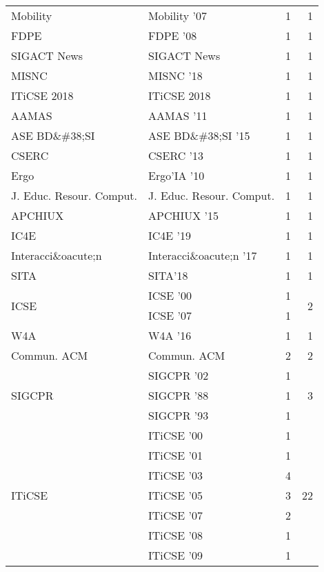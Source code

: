 \begin{table*}[t]
\begin{tabular}{llrr}
\multirow{1}{*}{Mobility } & Mobility '07 & 1 & \multirow{1}{*}{1}\\
\multirow{1}{*}{FDPE } & FDPE '08 & 1 & \multirow{1}{*}{1}\\
\multirow{1}{*}{SIGACT News} & SIGACT News & 1 & \multirow{1}{*}{1}\\
\multirow{1}{*}{MISNC } & MISNC '18 & 1 & \multirow{1}{*}{1}\\
\multirow{1}{*}{ITiCSE 2018} & ITiCSE 2018 & 1 & \multirow{1}{*}{1}\\
\multirow{1}{*}{AAMAS } & AAMAS '11 & 1 & \multirow{1}{*}{1}\\
\multirow{1}{*}{ASE BD\&\#38;SI } & ASE BD\&\#38;SI '15 & 1 & \multirow{1}{*}{1}\\
\multirow{1}{*}{CSERC } & CSERC '13 & 1 & \multirow{1}{*}{1}\\
\multirow{1}{*}{Ergo} & Ergo'IA '10 & 1 & \multirow{1}{*}{1}\\
\multirow{1}{*}{J. Educ. Resour. Comput.} & J. Educ. Resour. Comput. & 1 & \multirow{1}{*}{1}\\
\multirow{1}{*}{APCHIUX } & APCHIUX '15 & 1 & \multirow{1}{*}{1}\\
\multirow{1}{*}{IC4E } & IC4E '19 & 1 & \multirow{1}{*}{1}\\
\multirow{1}{*}{Interacci\&oacute;n } & Interacci\&oacute;n '17 & 1 & \multirow{1}{*}{1}\\
\multirow{1}{*}{SITA} & SITA'18 & 1 & \multirow{1}{*}{1}\\
\multirow{2}{*}{ICSE } & ICSE '00 & 1 & \multirow{2}{*}{2}\\
& ICSE '07 & 1 &\\
\multirow{1}{*}{W4A } & W4A '16 & 1 & \multirow{1}{*}{1}\\
\multirow{1}{*}{Commun. ACM} & Commun. ACM & 2 & \multirow{1}{*}{2}\\
\multirow{3}{*}{SIGCPR } & SIGCPR '02 & 1 & \multirow{3}{*}{3}\\
& SIGCPR '88 & 1 &\\
& SIGCPR '93 & 1 &\\
\multirow{14}{*}{ITiCSE } & ITiCSE '00 & 1 & \multirow{14}{*}{22}\\
& ITiCSE '01 & 1 &\\
& ITiCSE '03 & 4 &\\
& ITiCSE '05 & 3 &\\
& ITiCSE '07 & 2 &\\
& ITiCSE '08 & 1 &\\
& ITiCSE '09 & 1 &\\

\end{tabular}
\end{table*}
